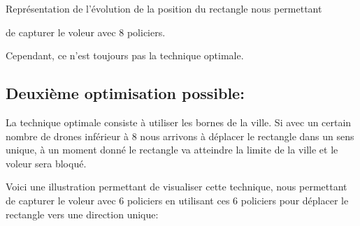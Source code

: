 \begin{figureleg}
\begin{center}
\begin{tikzpicture}[scale=0.5]
\end{tikzpicture}

\medskip

Représentation de l'évolution de la position du rectangle nous permettant

de capturer le voleur avec 8 policiers.
\end{center}
\end{figureleg}

Cependant, ce n'est toujours pas la technique optimale.
\subsection{Deuxième optimisation possible:}
La technique optimale consiste à utiliser les bornes de la ville. Si avec un certain nombre de drones inférieur à 8 nous arrivons à déplacer le rectangle dans un sens unique, à un moment donné le rectangle va atteindre la limite de la ville et le voleur sera bloqué.

Voici une illustration permettant de visualiser cette technique, nous permettant de capturer le voleur avec 6 policiers en utilisant ces 6 policiers pour déplacer le rectangle vers une direction unique:


